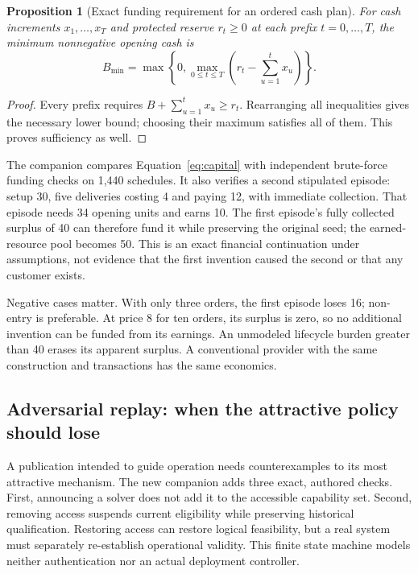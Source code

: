 \documentclass[11pt,letterpaper]{article}
\newtheorem{proposition}{Proposition}[section]
\theoremstyle{remark}\newtheorem{remark}{Remark}[section]
\begin{document}
\begin{proposition}[Exact funding requirement for an ordered cash plan]
For cash increments $x_1,\ldots,x_T$ and protected reserve $r_t\geq0$ at each prefix $t=0,\ldots,T$, the minimum nonnegative opening cash is
\begin{equation}
B_{\min}=\max\left\{0,\max_{0\leq t\leq T}\left(r_t-\sum_{u=1}^{t}x_u\right)\right\}.
\label{eq:capital}
\end{equation}
\end{proposition}
\begin{proof}
Every prefix requires $B+\sum_{u=1}^{t}x_u\geq r_t$. Rearranging all inequalities gives the necessary lower bound; choosing their maximum satisfies all of them. This proves sufficiency as well.
\end{proof}

The companion compares Equation~\eqref{eq:capital} with independent brute-force funding checks on 1,440 schedules. It also verifies a second stipulated episode: setup 30, five deliveries costing 4 and paying 12, with immediate collection. That episode needs 34 opening units and earns 10. The first episode's fully collected surplus of 40 can therefore fund it while preserving the original seed; the earned-resource pool becomes 50. This is an exact financial continuation under assumptions, not evidence that the first invention caused the second or that any customer exists.

Negative cases matter. With only three orders, the first episode loses 16; non-entry is preferable. At price 8 for ten orders, its surplus is zero, so no additional invention can be funded from its earnings. An unmodeled lifecycle burden greater than 40 erases its apparent surplus. A conventional provider with the same construction and transactions has the same economics.


\subsection{Adversarial replay: when the attractive policy should lose}
\label{sec:adversarial}
A publication intended to guide operation needs counterexamples to its most attractive mechanism. The new companion adds three exact, authored checks. First, announcing a solver does not add it to the accessible capability set. Second, removing access suspends current eligibility while preserving historical qualification. Restoring access can restore logical feasibility, but a real system must separately re-establish operational validity. This finite state machine models neither authentication nor an actual deployment controller.
\end{document}
